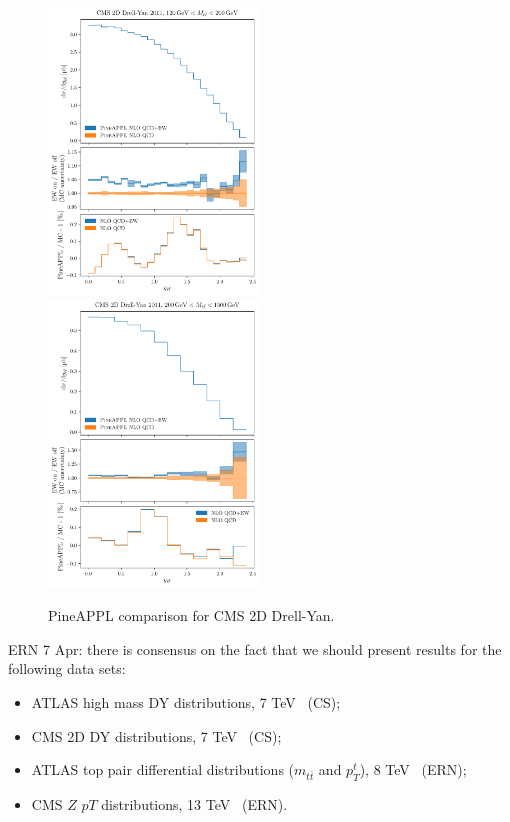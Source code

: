 \begin{figure}
    \centering
    \includegraphics[width=0.5\textwidth]{figures/pineappl_CMSDY2D11_bin5}%
    \includegraphics[width=0.5\textwidth]{figures/pineappl_CMSDY2D11_bin6}
    \caption{PineAPPL comparison for CMS 2D Drell-Yan.}
    \label{fig:cmsdy2d11_bins56}
\end{figure}


ERN 7 Apr: there is consensus on the fact that we should present results for the
following data sets:
\begin{itemize}
\item ATLAS high mass DY distributions, 7 TeV~\cite{Aad:2013iua} (CS);
\item CMS 2D DY distributions, 7 TeV~\cite{Chatrchyan:2013tia} (CS);
\item ATLAS top pair differential distributions ($m_{t\bar{t}}$ and $p_T^t$),
8 TeV~\cite{Aad:2015mbv} (ERN);
\item CMS $Z$ $pT$ distributions, 13 TeV~\cite{Sirunyan:2019bzr} (ERN).
\end{itemize}

